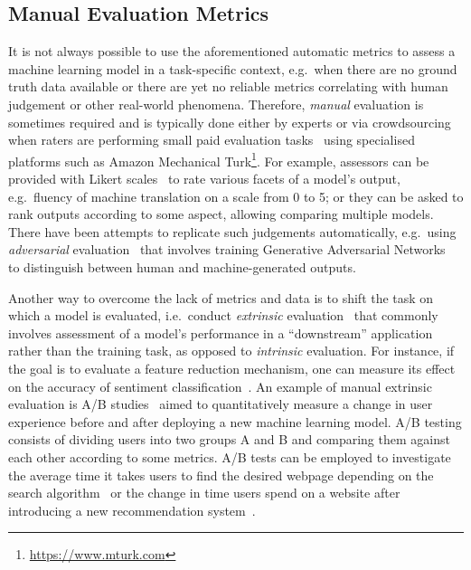 \subsection{Manual Evaluation Metrics}
It is not always possible to use the aforementioned automatic metrics to assess a machine learning model in a task-specific context, e.g.\ when there are no ground truth data available or there are yet no reliable metrics correlating with human judgement or other real-world phenomena.
Therefore, \emph{manual} evaluation is sometimes required and is typically done either by experts or via crowdsourcing when raters are performing small paid evaluation tasks~\citep{Alonso2008} using specialised platforms such as Amazon Mechanical Turk\footnote{\url{https://www.mturk.com}}.
For example, assessors can be provided with Likert scales~\citep{Likert1932} to rate various facets of a model's output, e.g.\ fluency of machine translation on a scale from 0 to 5;
or they can be asked to rank outputs according to some aspect, allowing comparing multiple models.
%
There have been attempts to replicate such judgements automatically, e.g.\
using \emph{adversarial} evaluation~\citep{martin2018speech} that
involves training Generative Adversarial Networks~\citep{Goodfellow2014} to distinguish between human and machine-generated outputs.

Another way to overcome the lack of metrics and data is to shift the task on which a model is evaluated, i.e.\ conduct \emph{extrinsic} evaluation~\citep{Belz2008} that commonly involves assessment of a model's performance in a ``downstream'' application rather than the training task, as opposed to \emph{intrinsic} evaluation.
For instance, if the goal is to evaluate a feature reduction mechanism, one can measure its effect on the accuracy of sentiment classification~\citep{Schnabel2015}.
%
An example of manual extrinsic evaluation is A/B studies~\citep{Hofmann2016} aimed to quantitatively measure a change in user experience before and after deploying a new machine learning model.
A/B testing consists of dividing users into two groups A and B and comparing them against each other according to some metrics.
%
A/B tests can be employed to investigate the average time it takes users to find the desired webpage depending on the search algorithm~\citep{Manning2008}
or the change in time users spend on a website after introducing a new recommendation system~\citep{Davidson2010}.

